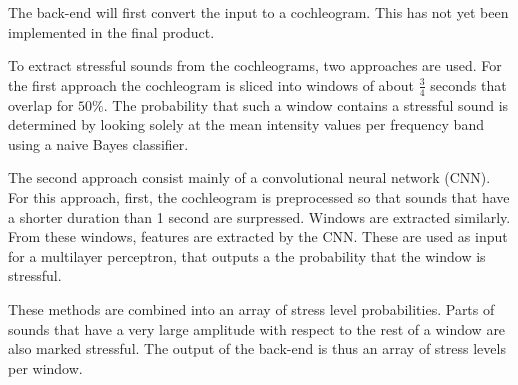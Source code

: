 The back-end will first convert the input to a cochleogram. This has not yet been implemented in the final product.

To extract stressful sounds from the cochleograms, two approaches are used. For the first approach the cochleogram is sliced into windows of about $\frac{3}{4}$ seconds that overlap for $50\%$. The probability that such a window contains a stressful sound is determined by looking solely at the mean intensity values per frequency band using a naive Bayes classifier.  

The second approach consist mainly of a convolutional neural network (CNN). For this approach, first, the cochleogram is preprocessed so that sounds that have a shorter duration than 1 second are surpressed. Windows are extracted similarly. From these windows, features are extracted by the CNN. These are used as input for a multilayer perceptron, that outputs a the probability that the window is stressful. 

These methods are combined into an array of stress level probabilities. Parts of sounds that have a very large amplitude with respect to the rest of a window are also marked stressful. The output of the back-end is thus an array of stress levels per window.




